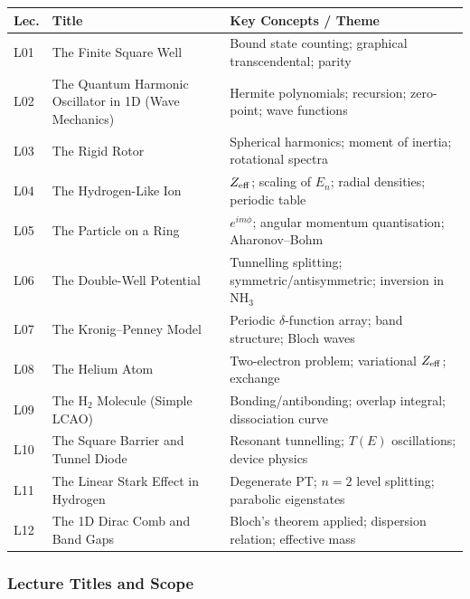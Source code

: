 \documentclass[11pt,a4paper]{article}
\begin{document}
{\footnotesize
\begin{center}
\begin{tabular}{@{}lp{4.2cm}p{6.8cm}@{}}
\toprule
\textbf{Lec.} & \textbf{Title} & \textbf{Key Concepts / Theme}\\
\midrule
L01 & The Finite Square Well & Bound state counting; graphical transcendental; parity\\
L02 & The Quantum Harmonic Oscillator in 1D (Wave Mechanics) & Hermite polynomials; recursion; zero-point; wave functions\\
L03 & The Rigid Rotor & Spherical harmonics; moment of inertia; rotational spectra\\
L04 & The Hydrogen-Like Ion & $Z_{\rm eff}$; scaling of $E_n$; radial densities; periodic table\\
L05 & The Particle on a Ring & $e^{im\phi}$; angular momentum quantisation; Aharonov--Bohm\\
L06 & The Double-Well Potential & Tunnelling splitting; symmetric/antisymmetric; inversion in NH$_3$\\
\midrule
L07 & The Kronig--Penney Model & Periodic $\delta$-function array; band structure; Bloch waves\\
L08 & The Helium Atom & Two-electron problem; variational $Z_{\rm eff}$; exchange\\
L09 & The H$_2$ Molecule (Simple LCAO) & Bonding/antibonding; overlap integral; dissociation curve\\
L10 & The Square Barrier and Tunnel Diode & Resonant tunnelling; $T(E)$ oscillations; device physics\\
L11 & The Linear Stark Effect in Hydrogen & Degenerate PT; $n=2$ level splitting; parabolic eigenstates\\
L12 & The 1D Dirac Comb and Band Gaps & Bloch's theorem applied; dispersion relation; effective mass\\
\bottomrule
\end{tabular}
\end{center}
}

\subsubsection*{Lecture Titles and Scope}
\end{document}
